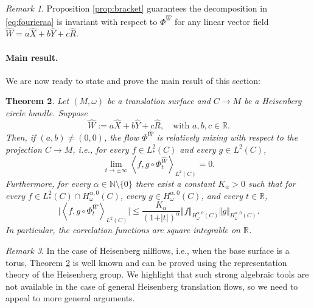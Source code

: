 \documentclass{amsart}
\newtheorem{theorem}{Theorem}[section]
\theoremstyle{definition}
\theoremstyle{remark}
\newtheorem{remark}[theorem]{Remark}
\numberwithin{equation}{section}
\newcommand{\wX}{\widehat{X}}
\newcommand{\wY}{\widehat{Y}}
\newcommand{\wW}{\widehat{W}}
\newcommand{\wR}{\widehat{R}}
\newcommand{\<}{{\langle}}
\renewcommand{\>}{{\rangle}}
\newcommand{\field}[1]{\mathbb{#1}}
\newcommand{\R}{\field{R}}
\newcommand{\N}{\field{N}}
\begin{document}
\begin{remark}   Proposition \ref{prop:bracket} guarantees the decomposition in \eqref{eq:fourieraa} is invariant with respect to $\Phi^{\wW}$ for any linear vector field $\wW = a\wX + b\wY+ c\wR$.
\end{remark}

\paragraph*{\bf Main result.} We are now ready to state and prove the main result of this section: 

\begin{theorem}
    \label{thm:rel_mix_new}
    Let $(M,\omega)$ be a translation surface and $C \to M$ be a Heisenberg circle bundle. Suppose
    \[
    \widehat{W} := a \widehat{X} + b \widehat{Y} + c \widehat{R}, \quad \text{with } a,b,c \in \mathbb{R}.
    \]
    Then, if $(a,b)\not =(0,0)$, the flow $\Phi^{\wW}$ is relatively mixing with respect to the projection $C \to M$, i.e., for every $f \in L^2_*(C)$ and every $g \in L^2(C)$,
    \[
    \lim_{t \to \pm \infty} \left\langle f, g \circ \Phi^{\wW}_t \right\rangle_{L^2(C)} = 0.
    \]
     Furthermore, for every $\alpha \in \N\setminus \{0\}$ there exist a constant $K_\alpha>0$ such that for every $f \in L^2_*(C) \cap H^{\alpha,0}_{\omega}(C)$, every $g\in H^{\alpha,0}_{\omega}(C)$, and every $t\in \R$,
     $$
     \bigg\vert \left\langle f, g  \circ \Phi^{\wW}_t\right\rangle_{L^2(C)} \bigg\vert \leq \frac{K_\alpha}{(1+\vert t\vert)^\alpha} \Vert f \Vert_{H^{\alpha,0}_{\omega}(C)} \Vert g \Vert_{H^{\alpha,0}_{\omega}(C)}.
     $$
     In particular, the correlation functions are square integrable on $\R$.
\end{theorem}

\begin{remark}
    In the case of Heisenberg nilflows, i.e., when the base surface is a torus, Theorem \ref{thm:rel_mix_new} is well known and can be proved using the representation theory of the Heisenberg group. We highlight that such strong algebraic tools are not available in the case of general Heisenberg translation flows, so we need to appeal to more general arguments.
\end{remark}
\end{document}
